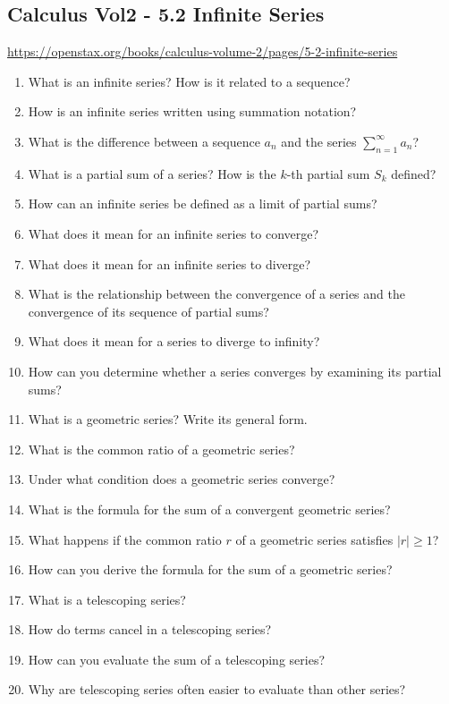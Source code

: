 \subsection{Calculus Vol2 - 5.2 Infinite Series}

\url{https://openstax.org/books/calculus-volume-2/pages/5-2-infinite-series}

\begin{enumerate}
  \item What is an infinite series? How is it related to a sequence?
  \item How is an infinite series written using summation notation?
  \item What is the difference between a sequence \({a_{n}}\) and the series \(\sum_{n=1}^{\infty}a_{n}\)?
  \item What is a partial sum of a series? How is the \(k\)-th partial sum \(S_{k}\) defined?
  \item How can an infinite series be defined as a limit of partial sums?
  \item What does it mean for an infinite series to converge?
  \item What does it mean for an infinite series to diverge?
  \item What is the relationship between the convergence of a series and the convergence of its sequence of partial sums?
  \item What does it mean for a series to diverge to infinity?
  \item How can you determine whether a series converges by examining its partial sums?
  \item What is a geometric series? Write its general form.
  \item What is the common ratio of a geometric series?
  \item Under what condition does a geometric series converge?
  \item What is the formula for the sum of a convergent geometric series?
  \item What happens if the common ratio \(r\) of a geometric series satisfies \(|r| \geq 1\)?
  \item How can you derive the formula for the sum of a geometric series?
  \item What is a telescoping series?
  \item How do terms cancel in a telescoping series?
  \item How can you evaluate the sum of a telescoping series?
  \item Why are telescoping series often easier to evaluate than other series?

\end{enumerate}

